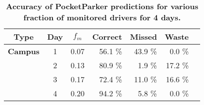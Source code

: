 \begin{table}[t!]
\begin{threeparttable}
{\small
\begin{tabularx}{\columnwidth}{Xccrrrr}
\multicolumn{1}{c}{\textbf{Type}} & 
\multicolumn{1}{c}{\textbf{Day}} & 
\multicolumn{1}{c}{\textbf{$f_m$}} & 
\multicolumn{1}{c}{\textbf{Correct}} & 
\multicolumn{1}{c}{\textbf{Missed}} & 
\multicolumn{1}{c}{\textbf{Waste}}\\ \toprule

\textbf{Campus} & 1 & 0.07 & 56.1 \% & 43.9 \% & 0.0 \% \\
& 2 & 0.13 & 80.9 \% & 1.9 \% & 17.2 \% \\
& 3 & 0.17 & 72.4 \% & 11.0 \% & 16.6 \% \\
& 4 & 0.20 & 94.2 \% & 5.8 \% & 0.0 \% \\
\end{tabularx}
}
\caption{\textbf{Accuracy of PocketParker predictions for various fraction of monitored drivers for 4 days.}}
\label{table-accuracy}
\end{threeparttable}
\end{table}
